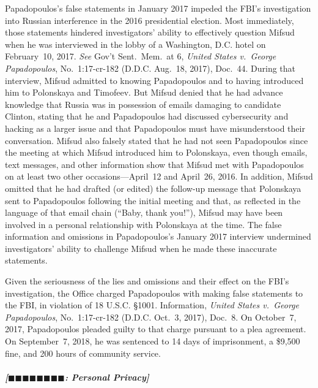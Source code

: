 Papadopoulos's false statements in January 2017 impeded the FBI's investigation into Russian interference in the 2016 presidential election.
Most immediately, those statements hindered investigators' ability to effectively question Mifsud when he was interviewed in the lobby of a Washington, D.C. hotel on February~10, 2017.
\textit{See} Gov't Sent.~Mem.~at 6, \textit{United States v.\ George Papadopoulos}, No.~1:17-cr-182 (D.D.C. Aug.~18, 2017), Doc.~44.
During that interview, Mifsud admitted to knowing Papadopoulos and to having introduced him to Polonskaya and Timofeev.
But Mifsud denied that he had advance knowledge that Russia was in possession of emails damaging to candidate Clinton, stating that he and Papadopoulos had discussed cybersecurity and hacking as a larger issue and that Papadopoulos must have misunderstood their conversation.
Mifsud also falsely stated that he had not seen Papadopoulos since the meeting at which Mifsud introduced him to Polonskaya, even though emails, text messages, and other information show that Mifsud met with Papadopoulos on at least two other occasions---April~12 and April~26, 2016.
In addition, Mifsud omitted that he had drafted (or edited) the follow-up message that Polonskaya sent to Papadopoulos following the initial meeting and that, as reflected in the language of that email chain (``Baby, thank you!''), Mifsud may have been involved in a personal relationship with Polonskaya at the time.
The false information and omissions in Papadopoulos's January 2017 interview undermined investigators' ability to challenge Mifsud when he made these inaccurate statements.

Given the seriousness of the lies and omissions and their effect on the FBI's investigation, the Office charged Papadopoulos with making false statements to the FBI, in violation of 18 U.S.C. \S 1001.
Information, \textit{United States v.\ George Papadopoulos}, No.~1:17-cr-182 (D.D.C. Oct.~3, 2017), Doc.~8.
On October~7, 2017, Papadopoulos pleaded guilty to that charge pursuant to a plea agreement.
On September~7, 2018, he was sentenced to 14 days of imprisonment, a \$9,500 fine, and 200 hours of community service.

\subparagraph{[$\blacksquare\blacksquare\blacksquare\blacksquare\blacksquare\blacksquare\blacksquare\blacksquare$: Personal Privacy]}


